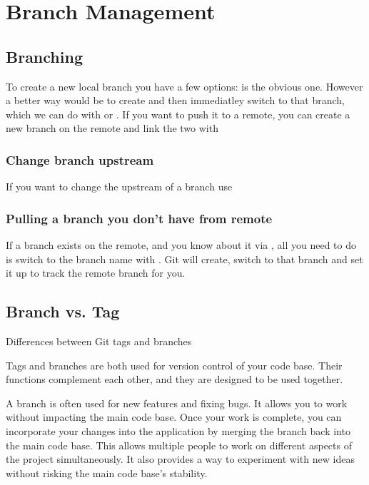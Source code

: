 \chapter{Branch Management}
\chapteroverlayB

\section{Branching}
To create a new local branch you have a few options:  is the obvious one. However a better way would be to create and then immediatley switch to that branch, which we can do with  or .
\nln If you want to push it to a remote, you can create a new branch on the remote and link the two with 

\subsection{Change branch upstream}
If you want to change the upstream of a branch use 
\subsection{Pulling a branch you don't have from remote}
If a branch exists on the remote, and you know about it via , all you need to do is switch to the branch name with . Git will create, switch to that branch and set it up to track the remote branch for you.

\section{Branch vs. Tag}
Differences between Git tags and branches

Tags and branches are both used for version control of your code base. Their functions complement each other, and they are designed to be used together.

A branch is often used for new features and fixing bugs. It allows you to work without impacting the main code base. Once your work is complete, you can incorporate your changes into the application by merging the branch back into the main code base. This allows multiple people to work on different aspects of the project simultaneously. It also provides a way to experiment with new ideas without risking the main code base's stability.

